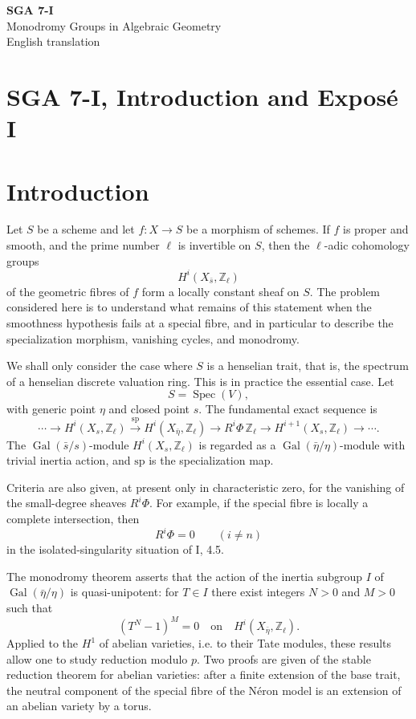 \documentclass[11pt]{article}
\theoremstyle{plain}
\theoremstyle{definition}
\theoremstyle{remark}
\newcommand{\ZZ}{\mathbb Z}
\DeclareMathOperator{\Spec}{Spec}
\DeclareMathOperator{\Gal}{Gal}
\newcommand{\longto}{\longrightarrow}
\begin{document}
\begin{titlepage}
\centering
\vspace*{2.3in}
{\LARGE\textbf{SGA 7-I}}\\[0.5em]
{\Large Monodromy Groups in Algebraic Geometry}\\[1.5em]
{\large English translation}
\vfill
\end{titlepage}
\tableofcontents


\clearpage
\section*{SGA 7-I, Introduction and Exposé I}

\section*{Introduction}

Let $S$ be a scheme and let $f:X\to S$ be a morphism of schemes. If $f$ is proper and smooth, and the prime number $\ell$ is invertible on $S$, then the $\ell$-adic cohomology groups
\[
H^i(X_{\bar s},\ZZ_\ell)
\]
of the geometric fibres of $f$ form a locally constant sheaf on $S$. The problem considered here is to understand what remains of this statement when the smoothness hypothesis fails at a special fibre, and in particular to describe the specialization morphism, vanishing cycles, and monodromy.

We shall only consider the case where $S$ is a henselian trait, that is, the spectrum of a henselian discrete valuation ring. This is in practice the essential case. Let
\[
S=\Spec(V),
\]
with generic point $\eta$ and closed point $s$. The fundamental exact sequence is
\[
\cdots \longto H^i(X_s,\ZZ_\ell)
\xrightarrow{\mathrm{sp}}
H^i(X_{\bar\eta},\ZZ_\ell)
\longto R^i\Phi\,\ZZ_\ell
\longto H^{i+1}(X_s,\ZZ_\ell)
\longto\cdots .
\]
The $\Gal(\bar s/s)$-module $H^i(X_s,\ZZ_\ell)$ is regarded as a $\Gal(\bar\eta/\eta)$-module with trivial inertia action, and $\mathrm{sp}$ is the specialization map.

Criteria are also given, at present only in characteristic zero, for the vanishing of the small-degree sheaves $R^i\Phi$. For example, if the special fibre is locally a complete intersection, then
\[
R^i\Phi=0\qquad (i\neq n)
\]
in the isolated-singularity situation of I, 4.5.

The monodromy theorem asserts that the action of the inertia subgroup $I$ of $\Gal(\bar\eta/\eta)$ is quasi-unipotent: for $T\in I$ there exist integers $N>0$ and $M>0$ such that
\[
(T^N-1)^M=0
\quad\text{on}\quad
H^i(X_{\bar\eta},\ZZ_\ell).
\]
Applied to the $H^1$ of abelian varieties, i.e. to their Tate modules, these results allow one to study reduction modulo $p$. Two proofs are given of the stable reduction theorem for abelian varieties: after a finite extension of the base trait, the neutral component of the special fibre of the Néron model is an extension of an abelian variety by a torus.
\end{document}
